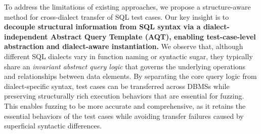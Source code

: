 \documentclass[conference]{IEEEtran}
\begin{document}



To address the limitations of existing approaches, we propose a structure-aware method for cross-dialect transfer of SQL test cases. 
Our key insight is to \textbf{decouple structural information from SQL syntax via a dialect-independent Abstract Query Template (AQT), enabling test-case-level abstraction and dialect-aware instantiation.}
We observe that, although different SQL dialects vary in function naming or syntactic sugar, they typically share an \textit{invariant abstract query logic} that governs the underlying operations and relationships between data elements.
By separating the core query logic from dialect-specific syntax, test cases can be transferred across DBMSs while preserving structurally rich execution behaviors that are essential for fuzzing. 
This enables fuzzing to be more accurate and comprehensive, as it retains the essential behaviors of the test cases while avoiding transfer failures caused by superficial syntactic differences.
\end{document}
